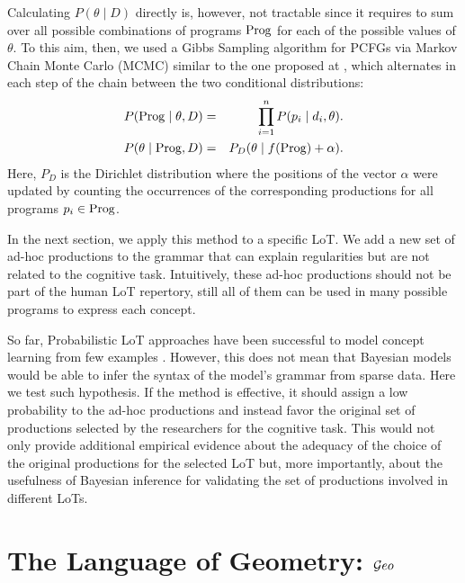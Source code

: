 Calculating $P(\theta \mid D)$ directly is, however, not tractable since it requires to sum over all possible combinations of programs ${\rm Prog}$ for each of the possible values of $\theta$. To this aim, then, we used a Gibbs Sampling \cite{geman1984stochastic} algorithm for PCFGs via Markov Chain Monte Carlo (MCMC) similar to the one proposed at \cite{johnson2007bayesian}, which alternates in each step of the chain between the two conditional distributions:
%
\begin{eqnarray}
\label{eqE}
P({\rm Prog} \mid \theta, D) &=& \prod\limits_{i=1}^n P(p_i \mid d_i, \theta).\\
P(\theta \mid {\rm Prog}, D) &=& P_D(\theta \mid f({\rm Prog}) + \alpha).
\end{eqnarray}
Here, $P_D$ is the Dirichlet distribution where the positions of the vector $\alpha$ were updated by counting the occurrences of the corresponding productions for all programs $p_i \in {\rm Prog}$.

In the next section, we apply this method to a specific LoT. We add a new set of ad-hoc productions to the grammar that can explain regularities but are not related to the cognitive task. Intuitively, these ad-hoc productions should not be part of the human LoT repertory, still all of them can be used in many possible programs to express each concept.

So far, Probabilistic LoT approaches have been successful to model concept learning from few examples \cite{tenenbaum2011grow,piantadosi2016four}. However, this does not mean that Bayesian models would be able to infer the syntax of the model's grammar from sparse data. Here we test such hypothesis. If the method is effective, it should assign a low probability to the ad-hoc productions and instead favor the original set of productions selected by the researchers for the cognitive task. This would not only provide additional empirical evidence about the adequacy of the choice of the original productions for the selected LoT but, more importantly, about the usefulness of Bayesian inference for validating the set of productions involved in different LoTs.

\section{The Language of Geometry: $\mathcal Geo$}

